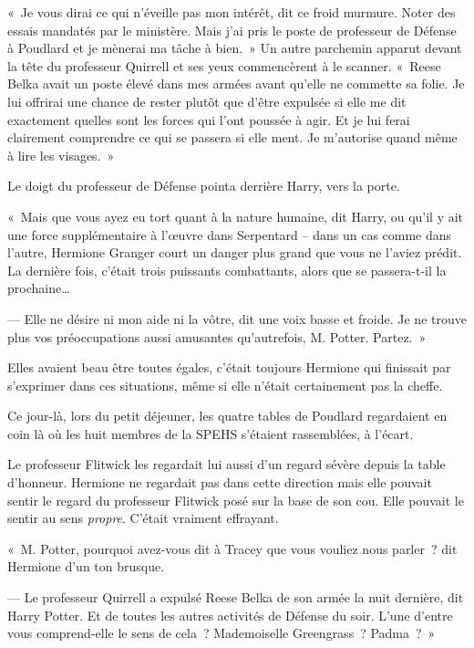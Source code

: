 «~Je vous dirai ce qui n'éveille pas mon intérêt, dit ce froid murmure. Noter des essais mandatés par le ministère. Mais j'ai pris le poste de professeur de Défense à Poudlard et je mènerai ma tâche à bien.~» Un autre parchemin apparut devant la tête du professeur Quirrell et ses yeux commencèrent à le scanner. «~Reese Belka avait un poste élevé dans mes armées avant qu'elle ne commette sa folie. Je lui offrirai une chance de rester plutôt que d'être expulsée si elle me dit exactement quelles sont les forces qui l'ont poussée à agir. Et je lui ferai clairement comprendre ce qui se passera si elle ment. Je m'autorise quand même à lire les visages.~»

Le doigt du professeur de Défense pointa derrière Harry, vers la porte.

«~Mais que vous ayez eu tort quant à la nature humaine, dit Harry, ou qu'il y ait une force supplémentaire à l'œuvre dans Serpentard -- dans un cas comme dans l'autre, Hermione Granger court un danger plus grand que vous ne l'aviez prédit. La dernière fois, c'était trois puissants combattants, alors que se passera-t-il la prochaine…

--- Elle ne désire ni mon aide ni la vôtre, dit une voix basse et froide. Je ne trouve plus vos préoccupations aussi amusantes qu'autrefois, M. Potter. Partez.~»

\later

Elles avaient beau être toutes égales, c'était toujours Hermione qui finissait par s'exprimer dans ces situations, même si elle n'était certainement pas la cheffe.

Ce jour-là, lors du petit déjeuner, les quatre tables de Poudlard regardaient en coin là où les huit membres de la SPEHS s'étaient rassemblées, à l'écart.

Le professeur Flitwick les regardait lui aussi d'un regard sévère depuis la table d'honneur. Hermione ne regardait pas dans cette direction mais elle pouvait sentir le regard du professeur Flitwick posé sur la base de son cou. Elle pouvait le sentir au sens \emph{propre}. C'était vraiment effrayant.

«~M. Potter, pourquoi avez-vous dit à Tracey que vous vouliez nous parler~? dit Hermione d'un ton brusque.

--- Le professeur Quirrell a expulsé Reese Belka de son armée la nuit dernière, dit Harry Potter. Et de toutes les autres activités de Défense du soir. L'une d'entre vous comprend-elle le sens de cela~? Mademoiselle Greengrass~? Padma~?~»

